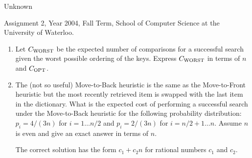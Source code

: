 \begin{authorship}Unknown\end{authorship}
\begin{usage}
Assignment 2, Year 2004, Fall Term, School of Computer Science at the University of Waterloo.
\end{usage}

\begin{enumerate}

\item Let $C_{\mbox{\scriptsize WORST}}$ be the expected number of
comparisons for a successful search given the worst possible ordering
of the keys.
%
Express $C_{\mbox{\scriptsize
WORST}}$ in terms of $n$ and $C_{\mbox{\scriptsize OPT}}$.

\item The (not so useful) Move-to-Back heuristic is the same as the
Move-to-Front heuristic but the most recently retrieved item is
swapped with the last item in the dictionary.
%
What is the expected cost of performing a successful search under the
Move-to-Back heuristic for the following probability distribution:
$p_i = 4/(3n)$ for $i=1\ldots n/2$ and $p_i = 2/(3n)$ for
$i=n/2+1\ldots n$.
%
Assume $n$ is even and give an exact answer in terms of $n$.
%
\begin{hint}
The correct solution has the form $c_1+c_2n$ for rational numbers
$c_1$ and $c_2$.
\end{hint}

\end{enumerate}

